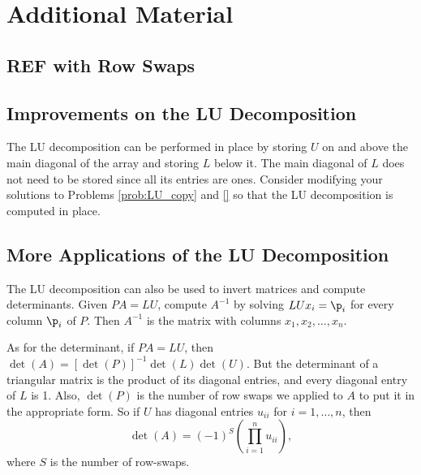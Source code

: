 \newpage

\section*{Additional Material} %

\subsection*{REF with Row Swaps} %

\subsection*{Improvements on the LU Decomposition} %

The LU decomposition can be performed in place by storing $U$ on and above the main diagonal of the array and storing $L$ below it.
The main diagonal of $L$ does not need to be stored since all its entries are ones.
Consider modifying your solutions to Problems \ref{prob:LU_copy} and \ref{} so that the LU decomposition is computed in place.


\subsection*{More Applications of the LU Decomposition} %

The LU decomposition can also be used to invert matrices and compute determinants.
Given $PA = LU$, compute $A^{-1}$ by solving $LUx_i = \p_i$ for every column $\p_i$ of $P$.
Then $A^{-1}$ is the matrix with columns $x_1, x_2, \ldots, x_n$.

As for the determinant, if $PA=LU$, then $\det(A) = [\det(P)]^{-1}\det(L)\det(U)$.
But the determinant of a triangular matrix is the product of its diagonal entries, and every diagonal entry of $L$ is 1.
Also, $\det(P)$ is the number of row swaps we applied to $A$ to put it in the appropriate form.
So if $U$ has diagonal entries $u_{ii}$ for $i=1, \ldots, n$, then
\[\det(A) = (-1)^S\left(\displaystyle\prod_{i=1}^nu_{ii}\right),\]
where $S$ is the number of row-swaps.


